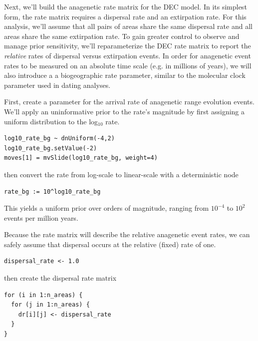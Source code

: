 Next, we'll build the anagenetic rate matrix for the DEC model.
In its simplest form, the rate matrix requires a dispersal rate and an extirpation rate.
For this analysis, we'll assume that all pairs of areas share the same dispersal rate and all areas share the same extirpation rate.
To gain greater control to observe and manage prior sensitivity, we'll reparameterize the DEC rate matrix to report the {\it relative} rates of dispersal versus extirpation events.
In order for anagenetic event rates to be measured on an absolute time scale (e.g. in millions of years), we will also introduce a a biogeographic rate parameter, similar to the molecular clock parameter used in dating analyses.

First, create a parameter for the arrival rate of anagenetic range evolution events.
We'll apply an uninformative prior to the rate's magnitude by first assigning a uniform distribution to the log$_{10}$ rate.

\begin{snugshade}
\begin{lstlisting}
log10_rate_bg ~ dnUniform(-4,2)
log10_rate_bg.setValue(-2)
moves[1] = mvSlide(log10_rate_bg, weight=4)
\end{lstlisting}
\end{snugshade}

then convert the rate from log-scale to linear-scale with a deterministic node

\begin{snugshade}
\begin{lstlisting}
rate_bg := 10^log10_rate_bg
\end{lstlisting}
\end{snugshade}

This yields a uniform prior over orders of magnitude, ranging from $10^{-4}$ to $10^2$ events per million years.

Because the rate matrix will describe the relative anagenetic event rates, we can safely assume that dispersal occurs at the relative (fixed) rate of one.

\begin{snugshade}
\begin{lstlisting}
dispersal_rate <- 1.0
\end{lstlisting}
\end{snugshade}

then create the dispersal rate matrix

\begin{snugshade}
\begin{lstlisting}
for (i in 1:n_areas) {
  for (j in 1:n_areas) {
    dr[i][j] <- dispersal_rate
  }
}
\end{lstlisting}
\end{snugshade}

